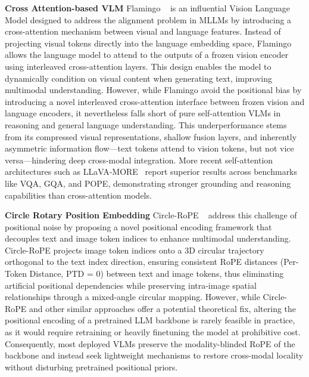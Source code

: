 \documentclass[11pt]{article}
\begin{document}
\textbf{Cross Attention-based VLM} Flamingo ~\citep{alayrac2022flamingo} is an influential Vision Language Model designed to address the alignment problem in MLLMs by introducing a cross-attention mechanism between visual and language features. Instead of projecting visual tokens directly into the language embedding space, Flamingo allows the language model to attend to the outputs of a frozen vision encoder using interleaved cross-attention layers. This design enables the model to dynamically condition on visual content when generating text, improving multimodal understanding. However, while Flamingo avoid the positional bias by introducing a novel interleaved cross-attention interface between frozen vision and language encoders, it nevertheless falls short of pure self-attention VLMs in reasoning and general language understanding. This underperformance stems from its compressed visual representations, shallow fusion layers, and inherently asymmetric information flow—text tokens attend to vision tokens, but not vice versa—hindering deep cross-modal integration. More recent self‑attention architectures such as LLaVA‑MORE~\citep{liu2024llavamore} report superior results across benchmarks like VQA, GQA, and POPE, demonstrating stronger grounding and reasoning capabilities than cross-attention models.



\textbf{Circle Rotary Position Embedding} Circle-RoPE ~\citep{wang2025circle} address this challenge of positional noise by proposing a novel positional encoding framework that decouples text and image token indices to enhance multimodal understanding. Circle-RoPE projects image token indices onto a 3D circular trajectory orthogonal to the text index direction, ensuring consistent RoPE distances (Per-Token Distance, PTD = 0) between text and image tokens, thus eliminating artificial positional dependencies while preserving intra-image spatial relationships through a mixed-angle circular mapping. However, while Circle-RoPE and other similar approaches offer a potential theoretical fix, altering the positional encoding of a pretrained LLM backbone is rarely feasible in practice, as it would require retraining or heavily finetuning the model at prohibitive cost. Consequently, most deployed VLMs preserve the modality-blinded RoPE of the backbone and instead seek lightweight mechanisms to restore cross-modal locality without disturbing pretrained positional priors.
\end{document}
